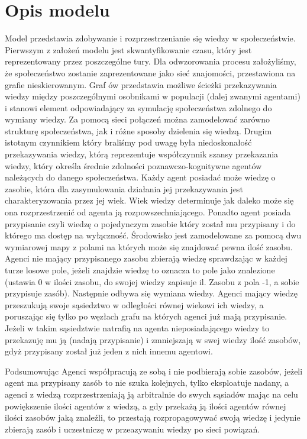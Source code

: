 \section{Opis modelu}

Model przedstawia zdobywanie i rozprzestrzenianie się wiedzy w społeczeństwie. Pierwszym z założeń modelu jest skwantyfikowanie czasu, który jest reprezentowany przez poszczególne tury. Dla odwzorowania procesu założyliśmy, że społeczeństwo zostanie zaprezentowane jako sieć znajomości, przestawiona na grafie nieskierowanym. Graf ów przedstawia możliwe ścieżki przekazywania wiedzy między poszczególnymi osobnikami w populacji (dalej zwanymi agentami) i stanowi element odpowiadający za symulację społeczeństwa zdolnego do wymiany wiedzy. Za pomocą sieci połączeń można zamodelować zarówno strukturę społeczeństwa, jak i różne sposoby dzielenia się wiedzą. Drugim istotnym czynnikiem który braliśmy pod uwagę była niedoskonałość przekazywania wiedzy, którą reprezentuje współczynnik szansy przekazania wiedzy, który określa średnie zdolności poznawczo-kognitywne agentów należących do danego społeczeństwa. Każdy agent posiadać może wiedzę o zasobie, która dla zasymulowania działania jej przekazywania jest charakteryzowania przez jej wiek. Wiek wiedzy determinuje jak daleko może się ona rozprzestrzenić od agenta ją rozpowszechniającego. Ponadto agent posiada przypisanie czyli wiedzę o pojedynczym zasobie który został mu przypisany i do którego ma dostęp na wyłączność. Środowisko jest zamodelowane za pomocą dwu wymiarowej mapy z polami na których może się znajdować pewna ilość zasobu. Agenci nie mający przypisanego zasobu zbierają wiedzę sprawdzając w każdej turze losowe pole, jeżeli znajdzie wiedzę to oznacza to pole jako znalezione (ustawia 0 w ilości zasobu, do swojej wiedzy zapisuje il. Zasobu z pola -1, a sobie przypisuje zasób). Następnie odbywa się wymiana wiedzy. Agenci mający wiedzę przeszukują swoje sąsiedztwo w odległości równej wiekowi ich wiedzy, a poruszając się tylko po węzłach grafu na których agenci już mają przypisanie. Jeżeli w takim sąsiedztwie natrafią na agenta nieposiadającego wiedzy to przekazuję mu ją (nadają przypisanie) i zmniejszają w swej wiedzy ilość zasobów, gdyż przypisany został już jeden z nich innemu agentowi.

Podsumowując Agenci współpracują ze sobą i nie podbierają sobie zasobów, jeżeli agent ma przypisany zasób to nie szuka kolejnych, tylko eksploatuje nadany, a agenci z wiedzą rozprzestrzeniają ją arbitralnie do swych sąsiadów mając na celu powiększenie ilości agentów z wiedzą, a gdy przekażą ją ilości agentów równej ilości zasobów jaką znaleźli, to przestają rozpropagowywać swoją wiedzę i jedynie zbierają zasób i uczestniczę w przeazywaniu wiedzy po sieci powiązań.

